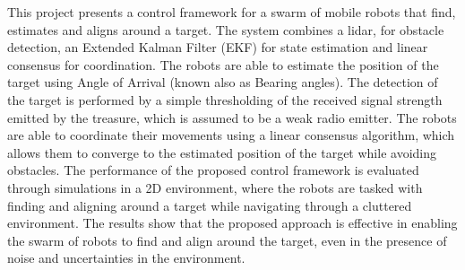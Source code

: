 \noindent This project presents a control framework for a swarm of mobile robots that find, estimates and aligns around a target. The system combines a lidar, for obstacle detection, an Extended Kalman Filter (EKF) for state estimation and linear consensus for coordination. The robots are able to estimate the position of the target using Angle of Arrival (known also as Bearing angles). The detection of the target is performed by a simple thresholding of the received signal strength emitted by the treasure, which is assumed to be a weak radio emitter. The robots are able to coordinate their movements using a linear consensus algorithm, which allows them to converge to the estimated position of the target while avoiding obstacles. The performance of the proposed control framework is evaluated through simulations in a 2D environment, where the robots are tasked with finding and aligning around a target while navigating through a cluttered environment. The results show that the proposed approach is effective in enabling the swarm of robots to find and align around the target, even in the presence of noise and uncertainties in the environment. 
